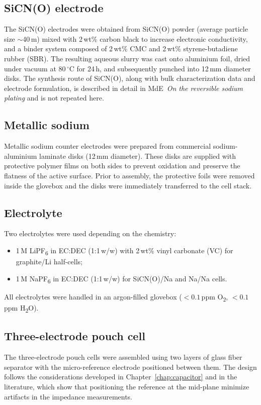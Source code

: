 \subsection{SiCN(O) electrode}
The SiCN(O) electrodes were obtained from SiCN(O) powder (average particle size $\sim$40\,\textmu m) mixed with 2\,wt\% carbon black to increase electronic conductivity, and a binder system composed of 2\,wt\% CMC and 2\,wt\% styrene-butadiene rubber (SBR).  
The resulting aqueous slurry was cast onto aluminium foil, dried under vacuum at 80\,$^\circ$C for 24\,h, and subsequently punched into 12\,mm diameter disks.  
The synthesis route of SiCN(O), along with bulk characterization data and electrode formulation, is described in detail in MdE~\textit{On the reversible sodium plating} and is not repeated here.

\subsection{Metallic sodium}
Metallic sodium counter electrodes were prepared from commercial sodium-aluminium laminate disks (12\,mm diameter).  
These disks are supplied with protective polymer films on both sides to prevent oxidation and preserve the flatness of the active surface.  
Prior to assembly, the protective foils were removed inside the glovebox and the disks were immediately transferred to the cell stack.

\subsection{Electrolyte}
Two electrolytes were used depending on the chemistry:
\begin{itemize}
    \item 1\,M LiPF\textsubscript{6} in EC:DEC (1:1\,w/w) with 2\,wt\% vinyl carbonate (VC) for graphite/Li half-cells;
    \item 1\,M NaPF\textsubscript{6} in EC:DEC (1:1\,w/w) for SiCN(O)/Na and Na/Na cells.
\end{itemize}
All electrolytes were handled in an argon-filled glovebox ($< 0.1$\,ppm O\textsubscript{2}, $< 0.1$\,ppm H\textsubscript{2}O).

\subsection{Three-electrode pouch cell}
The three-electrode pouch cells were assembled using two layers of glass fiber separator with the micro-reference electrode positioned between them.  
The design follows the considerations developed in Chapter~\ref{chap:capacitor} and in the literature, which show that positioning the reference at the mid-plane minimize artifacts in the impedance measurements.  

